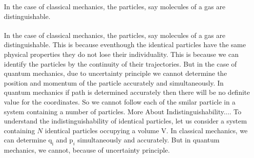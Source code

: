 In the case of classical mechanics, the particles, say molecules of a gas are distinguishable.\\\\
In the case of classical mechanics, the particles, say molecules of a gas are distinguishable. This is because eventhough the identical particles have the same physical properties they do not lose their individuality. This is because we can identify the particles by the continuity of their trajectories. But in the case of quantum mechanics, 
 due to uncertainty principle we cannot determine the position and momentum of the particle accurately and simultaneously. In quantum mechanics if path is determined accurately then there will be no definite value for the coordinates. So we cannot follow each of the smilar particle in a system containing a number of particles.
 More About Indistinguishability....
 To understand the indistinguishability of identical particles, let us consider a system containing $N$ identical particles occupying a volume V. In classical mechanics, we can determine $\mathrm{q}_{\mathrm{i}}$ and $\mathrm{p}_{i}$ simultaneously and accurately. But in quantum mechanics, we cannot, because of uncertainty principle.

